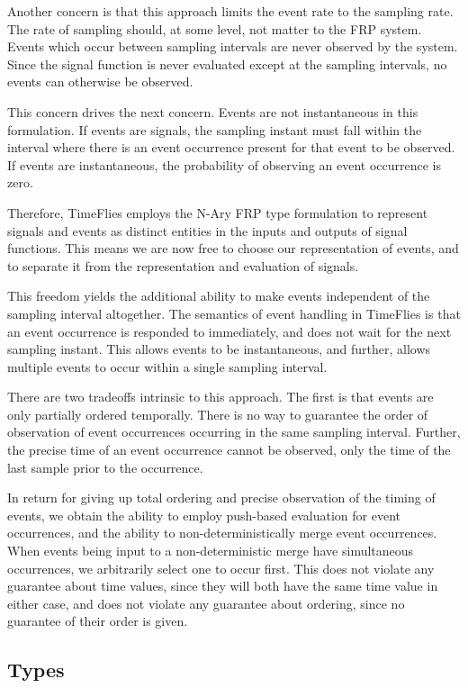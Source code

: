 Another concern is that this approach limits the event rate to the sampling rate.
The rate of sampling should, at some level, not matter to the FRP system. Events
which occur between sampling intervals are never observed by the system. Since
the signal function is never evaluated except at the sampling intervals, no
events can otherwise be observed.

This concern drives the next concern. Events are not instantaneous in this
formulation. If events are signals, the sampling instant must fall within
the interval where there is an event occurrence present for that event to be
observed. If events are instantaneous, the probability of observing an event 
occurrence is zero.

Therefore, TimeFlies employs the N-Ary FRP type formulation to represent signals and
events as distinct entities in the inputs and outputs of signal functions. This means
we are now free to choose our representation of events, and to separate it from the
representation and evaluation of signals.

This freedom yields the additional ability to make events independent of the sampling
interval altogether. The semantics of event handling in TimeFlies is that an event occurrence
is responded to immediately, and does not wait for the next sampling instant. This allows events
to be instantaneous, and further, allows multiple events to occur within a single sampling interval.

There are two tradeoffs intrinsic to this approach. The first is that events are only partially ordered
temporally. There is no way to guarantee the order of observation of event occurrences occurring in the
same sampling interval. Further, the precise time of an event occurrence cannot be observed, only the 
time of the last sample prior to the occurrence.

In return for giving up total ordering and precise observation of the timing of events, we obtain the
ability to employ push-based evaluation for event occurrences, and the ability to non-deterministically
merge event occurrences. When events being input to a non-deterministic merge have simultaneous occurrences,
we arbitrarily select one to occur first. This does not violate any guarantee about time values, since
they will both have the same time value in either case, and does not violate any guarantee about ordering,
since no guarantee of their order is given.

\subsection{Types}
\label{subsection:System_Design_and_Interface-Types}

